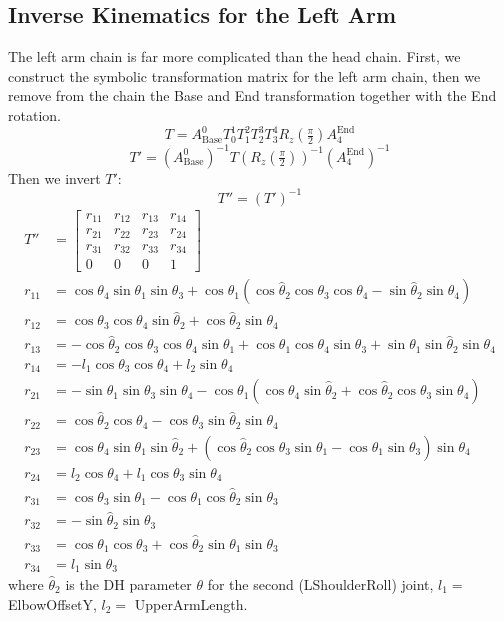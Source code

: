 \subsection{Inverse Kinematics for the Left Arm}
The left arm chain is far more complicated than the head chain. First, we construct the symbolic transformation matrix for the left arm chain, then we remove from the chain the Base and End transformation together with the End rotation.
\[
T = A^0_\text{Base}T^1_0T^2_1T^3_2T^4_3R_z(\tfrac{\pi}{2})A^\text{End}_{4}
\]
\[
T' = \left(A_\text{Base}^0\right)^{-1}T\left(R_z(\tfrac{\pi}{2})\right)^{-1}\left(A_4^\text{End}\right)^{-1}
\]
Then we invert $T'$:
\[
T'' = \left(T'\right)^{-1}
\]
\begin{align*}
T'' &= \begin{bmatrix}
r_{11} & r_{12} & r_{13} & r_{14}\\
r_{21} & r_{22} & r_{23} & r_{24}\\
r_{31} & r_{32} & r_{33} & r_{34}\\
0 & 0 & 0 & 1
\end{bmatrix}\\
r_{11} &= \cos\theta_4 \sin\theta_1 \sin\theta_3 + 
 \cos\theta_1 (\cos\widehat{\theta}_2 \cos\theta_3 \cos\theta_4 - \sin\widehat{\theta}_2 \sin\theta_4)\\
r_{12} &= \cos\theta_3 \cos\theta_4 \sin\widehat{\theta}_2 + \cos\widehat{\theta}_2 \sin\theta_4\\
r_{13} &= -\cos\widehat{\theta}_2 \cos\theta_3 \cos\theta_4 \sin\theta_1 + \cos\theta_1 \cos\theta_4 \sin\theta_3 + 
 \sin\theta_1 \sin\widehat{\theta}_2 \sin\theta_4\\
r_{14} &= -l_1 \cos\theta_3 \cos\theta_4 + l_2 \sin\theta_4\\
r_{21} &= -\sin\theta_1 \sin\theta_3 \sin\theta_4 - 
 \cos\theta_1 (\cos\theta_4 \sin\widehat{\theta}_2 + \cos\widehat{\theta}_2 \cos\theta_3 \sin\theta_4)\\
r_{22} &= \cos\widehat{\theta}_2 \cos\theta_4 - \cos\theta_3 \sin\widehat{\theta}_2 \sin\theta_4\\
r_{23} &= \cos\theta_4 \sin\theta_1 \sin\widehat{\theta}_2 + (\cos\widehat{\theta}_2 \cos\theta_3 \sin\theta_1 - \cos\theta_1 \sin\theta_3) \sin\theta_4\\
r_{24} &= l_2 \cos\theta_4 + l_1 \cos\theta_3 \sin\theta_4\\
r_{31} &= \cos\theta_3 \sin\theta_1 - \cos\theta_1 \cos\widehat{\theta}_2 \sin\theta_3\\
r_{32} &= -\sin\widehat{\theta}_2 \sin\theta_3\\
r_{33} &= \cos\theta_1 \cos\theta_3 + \cos\widehat{\theta}_2 \sin\theta_1 \sin\theta_3\\
r_{34} &= l_1 \sin\theta_3
\end{align*}
where $\widehat{\theta}_2$ is the DH parameter $\theta$ for the second (LShoulderRoll) joint, $l_1 =$ ElbowOffsetY, $l_2 =$ UpperArmLength.

